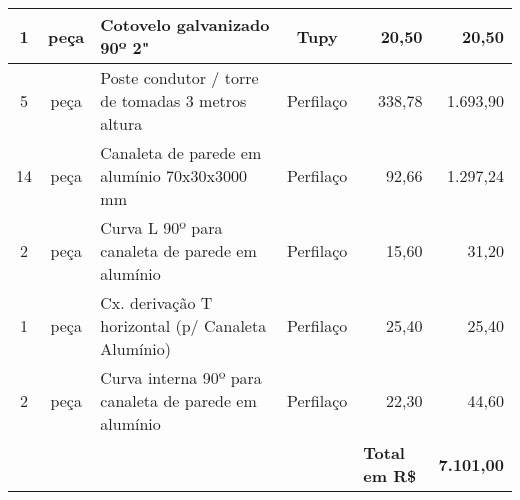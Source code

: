 \begin{table}[H]
{\begin{tabular}{cclc|r|r|}
		\multicolumn{1}{|c|}{1}                   & \multicolumn{1}{c|}{peça}             & \multicolumn{1}{l|}{Cotovelo galvanizado 90º 2"}                            & Tupy                  & 20,50                                              & 20,50                                           \\ \hline
		\multicolumn{1}{|c|}{5}                   & \multicolumn{1}{c|}{peça}             & \multicolumn{1}{l|}{Poste condutor / torre de tomadas 3 metros altura}      & Perfilaço             & 338,78                                             & 1.693,90                                        \\ \hline
		\multicolumn{1}{|c|}{14}                  & \multicolumn{1}{c|}{peça}             & \multicolumn{1}{l|}{Canaleta de parede em alumínio 70x30x3000 mm}           & Perfilaço             & 92,66                                              & 1.297,24                                        \\ \hline
		\multicolumn{1}{|c|}{2}                   & \multicolumn{1}{c|}{peça}             & \multicolumn{1}{l|}{Curva L 90º para canaleta de parede em alumínio}        & Perfilaço             & 15,60                                              & 31,20                                           \\ \hline
		\multicolumn{1}{|c|}{1}                   & \multicolumn{1}{c|}{peça}             & \multicolumn{1}{l|}{Cx. derivação T horizontal (p/ Canaleta Alumínio)}      & Perfilaço             & 25,40                                              & 25,40                                           \\ \hline
		\multicolumn{1}{|c|}{2}                   & \multicolumn{1}{c|}{peça}             & \multicolumn{1}{l|}{Curva interna 90º para canaleta de parede em alumínio}  & Perfilaço             & 22,30                                              & 44,60                                           \\ \hline
		\multicolumn{1}{l}{}                      & \multicolumn{1}{l}{}                  &                                                                             & \multicolumn{1}{l|}{} & \multicolumn{1}{l|}{\textbf{Total em R\$}}         & \textbf{7.101,00}                               \\ \cline{5-6} 
	\end{tabular}}
\end{table}